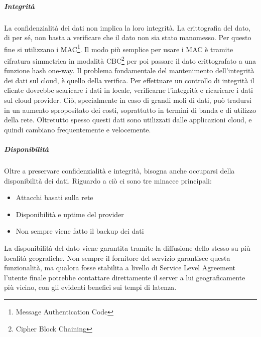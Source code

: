 \subparagraph{Integrità}
La confidenzialità dei dati non implica la loro integrità. La crittografia del dato, di per sé, non basta a verificare che il dato non sia stato manomesso.
Per questo fine si utilizzano i MAC\footnote{Message Authentication Code}. Il modo più semplice per usare i MAC è tramite cifratura simmetrica in modalità CBC\footnote{Cipher Block Chaining} per poi passare il dato crittografato a una funzione hash one-way. 
Il problema fondamentale del mantenimento dell'integrità dei dati sul cloud, è quello della verifica.\cite{CloudSecurityBook}
Per effettuare un controllo di integrità il cliente dovrebbe scaricare i dati in locale, verificarne l'integrità e ricaricare i dati sul cloud provider. Ciò, specialmente in caso di grandi moli di dati, può tradursi in un aumento spropositato dei costi, soprattutto in termini di banda e di utilizzo della rete.
Oltretutto spesso questi dati sono utilizzati dalle applicazioni cloud, e quindi cambiano frequentemente e velocemente.\cite{CloudSecurityBook}

\subparagraph{Disponibilità}
Oltre a preservare confidenzialità e integrità, bisogna anche occuparsi della disponibilità dei dati.\cite{CloudSecurityBook}
Riguardo a ciò ci sono tre minacce principali:
\begin{itemize}
\item Attacchi basati sulla rete
\item Disponibilità e uptime del provider
\item Non sempre viene fatto il backup dei dati
\end{itemize}
La disponibilità del dato viene garantita tramite la diffusione dello stesso su più località geografiche. Non sempre il fornitore del servizio garantisce questa funzionalità, ma qualora fosse stabilita a livello di Service Level Agreement l'utente finale potrebbe contattare direttamente il server a lui geograficamente più vicino, con gli evidenti benefici sui tempi di latenza.


